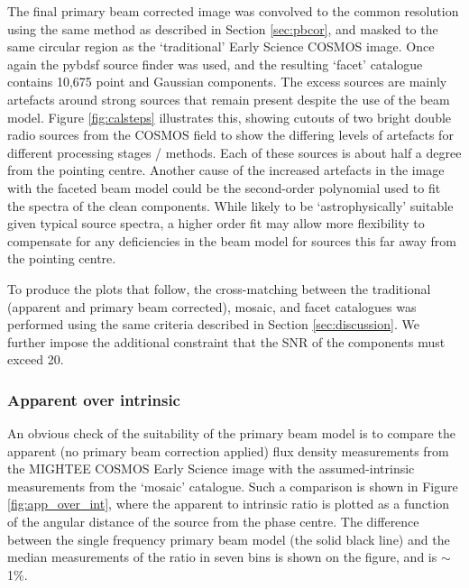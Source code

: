 \documentclass[usenatbib,usedcolumn]{mnras}
\begin{document}
The final primary beam corrected image was convolved to the common resolution using the same method as described in Section \ref{sec:pbcor}, and masked to the same circular region as the `traditional' Early Science COSMOS image. Once again the {\sc pybdsf} source finder was used, and the resulting `facet' catalogue contains 10,675 point and Gaussian components. The excess sources are mainly artefacts around strong sources that remain present despite the use of the beam model. Figure \ref{fig:calsteps} illustrates this, showing cutouts of two bright double radio sources from the COSMOS field to show the differing levels of artefacts for different processing stages / methods. Each of these sources is about half a degree from the pointing centre. Another cause of the increased artefacts in the image with the faceted beam model could be the second-order polynomial used to fit the spectra of the clean components. While likely to be `astrophysically' suitable given typical source spectra, a higher order fit may allow more flexibility to compensate for any deficiencies in the beam model for sources this far away from the pointing centre.

To produce the plots that follow, the cross-matching between the traditional (apparent and primary beam corrected), mosaic, and facet catalogues was performed using the same criteria described in Section \ref{sec:discussion}. We further impose the additional constraint that the SNR of the components must exceed 20.


\subsubsection{Apparent over intrinsic}
\label{sec:app_over_int}

An obvious check of the suitability of the primary beam model is to compare the apparent (no primary beam correction applied) flux density measurements from the MIGHTEE COSMOS Early Science image with the assumed-intrinsic measurements from the `mosaic' catalogue. Such a comparison is shown in Figure \ref{fig:app_over_int}, where the apparent to intrinsic ratio is plotted as a function of the angular distance of the source from the phase centre. The difference between the single frequency primary beam model (the solid black line) and the median measurements of the ratio in seven bins is shown on the figure, and is $\sim$1\%.
\end{document}
